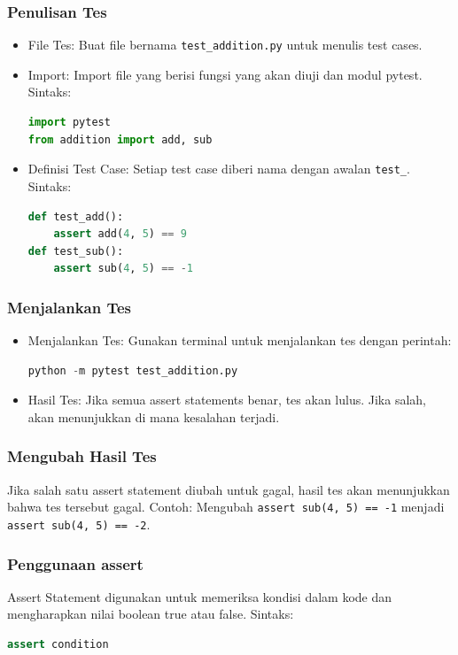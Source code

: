\documentclass{article}
\begin{document}
\subsubsection{Penulisan Tes}
\begin{itemize}
    \item File Tes: Buat file bernama \verb|test_addition.py| untuk menulis test cases.
    \item Import: Import file yang berisi fungsi yang akan diuji dan modul pytest.
          Sintaks:
          \begin{lstlisting}[language=Python, caption={}, captionpos=b]
import pytest
from addition import add, sub
    \end{lstlisting}
    \item Definisi Test Case: Setiap test case diberi nama dengan awalan \verb|test_|.
          Sintaks:
          \begin{lstlisting}[language=Python, caption={}, captionpos=b]
def test_add():
    assert add(4, 5) == 9
def test_sub():
    assert sub(4, 5) == -1
    \end{lstlisting}
\end{itemize}

\subsubsection{Menjalankan Tes}
\begin{itemize}
    \item Menjalankan Tes: Gunakan terminal untuk menjalankan tes dengan perintah:
          \begin{lstlisting}[language=Python, caption={}, captionpos=b]
    python -m pytest test_addition.py
    \end{lstlisting}
    \item Hasil Tes: Jika semua assert statements benar, tes akan lulus. Jika salah, akan menunjukkan di mana kesalahan terjadi.
\end{itemize}

\subsubsection{Mengubah Hasil Tes}
Jika salah satu assert statement diubah untuk gagal, hasil tes akan menunjukkan bahwa tes tersebut gagal.
Contoh: Mengubah \verb|assert sub(4, 5) == -1| menjadi \verb|assert sub(4, 5) == -2|.

\subsubsection{Penggunaan assert}
Assert Statement digunakan untuk memeriksa kondisi dalam kode dan mengharapkan nilai boolean true atau false.
Sintaks:
\begin{lstlisting}[language=Python, caption={}, captionpos=b]
assert condition
\end{lstlisting}
\end{document}

